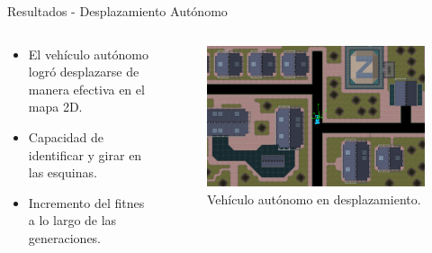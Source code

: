 \documentclass{beamer}
\begin{document}
\begin{frame}{Resultados - Desplazamiento Autónomo}
    \begin{columns}[T] %
        \begin{column}{0.6\textwidth}
            \begin{itemize}
                \item El vehículo autónomo logró desplazarse de manera efectiva en el mapa 2D.
                \item Capacidad de identificar y girar en las esquinas.
                \item Incremento del fitnes a lo largo de las generaciones.
            \end{itemize}
        \end{column}
        \begin{column}{0.5\textwidth}
            \begin{figure}
                \centering
                \includegraphics[width=\linewidth]{images/desplazamiento.png} %
                \caption{Vehículo autónomo en desplazamiento.}
            \end{figure}
        \end{column}
    \end{columns}
\end{frame}
\end{document}
